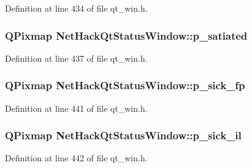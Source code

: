 Definition at line 434 of file qt\+\_\+win.\+h.

\hypertarget{classNetHackQtStatusWindow_a172ccb053e214f7600749b68624099c2}{
\subsubsection[{p\+\_\+satiated}]{\setlength{\rightskip}{0pt plus 5cm}Q\+Pixmap Net\+Hack\+Qt\+Status\+Window\+::p\+\_\+satiated\hspace{0.3cm}{\ttfamily [private]}}}\label{classNetHackQtStatusWindow_a172ccb053e214f7600749b68624099c2}


Definition at line 437 of file qt\+\_\+win.\+h.

\hypertarget{classNetHackQtStatusWindow_a3c53e5af6e1065e0d513849fad7d6123}{
\subsubsection[{p\+\_\+sick\+\_\+fp}]{\setlength{\rightskip}{0pt plus 5cm}Q\+Pixmap Net\+Hack\+Qt\+Status\+Window\+::p\+\_\+sick\+\_\+fp\hspace{0.3cm}{\ttfamily [private]}}}\label{classNetHackQtStatusWindow_a3c53e5af6e1065e0d513849fad7d6123}


Definition at line 441 of file qt\+\_\+win.\+h.

\hypertarget{classNetHackQtStatusWindow_a931ec3363e355478723d41909b6f5ff8}{
\subsubsection[{p\+\_\+sick\+\_\+il}]{\setlength{\rightskip}{0pt plus 5cm}Q\+Pixmap Net\+Hack\+Qt\+Status\+Window\+::p\+\_\+sick\+\_\+il\hspace{0.3cm}{\ttfamily [private]}}}\label{classNetHackQtStatusWindow_a931ec3363e355478723d41909b6f5ff8}


Definition at line 442 of file qt\+\_\+win.\+h.

